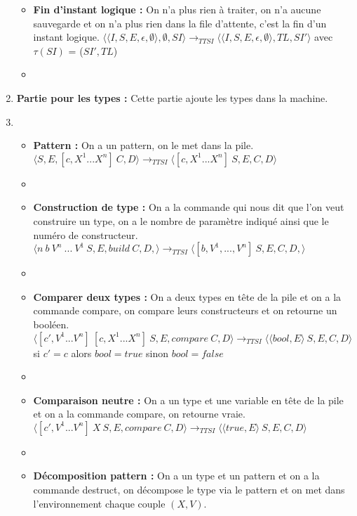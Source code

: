 \documentclass[10pt,a4paper]{report}
\begin{document}
\begin{enumerate}
\begin{itemize}
			\item[] \textbf{Fin d'instant logique :} On n'a plus rien à traiter, on n'a aucune sauvegarde et on n'a plus rien dans la file d'attente, c'est la fin d'un instant logique.
			\smallbreak
			$\langle\langle I,S,E,\epsilon,\emptyset \rangle ,\emptyset,SI\rangle 
			\longrightarrow_{TTSI} 
			\langle\langle I,S,E,\epsilon,\emptyset\rangle,TL,SI'\rangle$
			avec $\tau(SI)$ = ($SI',TL$) 
			\item[]
			
		\end{itemize}
		\item[] \textbf{Partie pour les types :} Cette partie ajoute les types dans la machine.
		\item[]
		\begin{itemize}
			\item[] \textbf{Pattern :} On a un pattern, on le met dans la pile.
			\smallbreak
			$\langle S,E,[c,X^{1}...X^{n}]~C,D\rangle
			\longrightarrow_{TTSI} \langle [c,X^{1}...X^{n}]~S,E,C,D\rangle$ 
			\item[]
			\item[] \textbf{Construction de type :} On a la commande qui nous dit que l'on veut construire un type, on a le nombre de paramètre indiqué ainsi que le numéro de constructeur.
			\smallbreak
			$\langle n~b~V^{n}~...~V^{1}~S,E,build~C,D,\rangle
			\longrightarrow_{TTSI} 
			\langle [b,V^{1},...,V^{n}]~S,E,C,D,\rangle$
			\item[]
			\item[] \textbf{Comparer deux types :} On a deux types en tête de la pile et on a la commande compare, on compare leurs constructeurs et on retourne un booléen. 
			\smallbreak
			$\langle [c',V^{1}...V^{n}]~[c,X^{1}...X^{n}]~S,E,compare~C,D\rangle
			\longrightarrow_{TTSI} 
			\langle \langle bool,E\rangle~S,E,C,D\rangle$ 
			\\ si $c'=c$ alors $bool = true$ sinon $bool = false$ 
			\item[]
			\item[] \textbf{Comparaison neutre :} On a un type et une variable en tête de la pile et on a la commande compare, on retourne vraie. 
			\smallbreak
			$\langle [c',V^{1}...V^{n}]~X~S,E,compare~C,D\rangle
			\longrightarrow_{TTSI} 
			\langle \langle true,E\rangle~S,E,C,D\rangle$ 
			\item[]
			\item[] \textbf{Décomposition pattern :} On a un type et un pattern et on a la commande destruct, on décompose le type via le pattern et on met dans l'environnement chaque couple $(X,V)$.

\end{itemize}
\end{enumerate}
\end{document}
